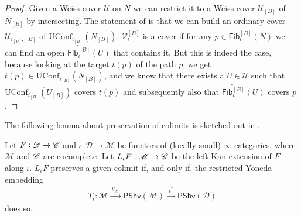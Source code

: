 \documentclass[../text]{subfiles}
\begin{document}
\begin{proof}
    Given a Weiss cover $\mathscr{U}$ on $N$ we can restrict it to a Weiss cover $\mathscr{U}_{[B]}$ of $N_{[B]}$ by intersecting. The statement of  is that we can build an ordinary cover $\mathscr{U}_{i_{[B]},[B]}$ of $\mathrm{UConf}_{i_{[B]}}(N_{[B]})$. $\mathscr{V}_{\iota}^{[B]}$ is a cover if for any $p \in \widetilde{\mathsf{Fib}_{\iota}^{[B]}}(N)$ we can find an open $\widetilde{\mathsf{Fib}_{\iota}^{[B]}}(U)$ that contains it. But this is indeed the case, because looking at the target $t(p)$ of the path $p$, we get $t(p) \in \mathrm{UConf}_{i_{[B]}}(N_{[B]})$, and we know that there exists a $U \in \mathscr{U}$ such that $\mathrm{UConf}_{i_{[B]}}(U_{[B]})$ covers $t(p)$ and subsequently also that $\widetilde{\mathsf{Fib}_{\iota}^{[B]}}(U)$ covers $p$.
\end{proof}


The following lemma about preservation of colimits is sketched out in \cite{rezk2023lan}.
%
\begin{lemma}\label{lem:Lan_preserve_colim}
    Let $F: \mathscr{D} \xrightarrow{} \mathscr{C}$ and $\iota: \mathscr{D} \xrightarrow{} \mathscr{M}$ be functors of (locally small) $\infty$-categories, where $\mathscr{M}$ and $\mathscr{C}$ are cocomplete. Let $L_{\iota} F: \mathscr{M} \xrightarrow{} \mathscr{C}$ be the left Kan extension of $F$ along $\iota$. $L_{\iota} F$ preserves a given colimit if, and only if, the restricted Yoneda embedding
    \begin{align}
        T_{\iota}: \mathscr{M} \xrightarrow{\ y_{\mathscr{M}} \ } \mathsf{PShv}(\mathscr{M}) \xrightarrow{\ \iota^* \ } \mathsf{PShv}(\mathscr{D}) 
    \end{align}
    does so.
\end{lemma}
\end{document}
